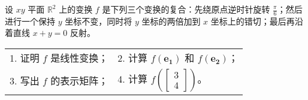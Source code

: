 	\begin{exercise}[1.2.7]
		设 $xy$ 平面 $\mathbb{R}^2$ 上的变换 $f$ 是下列三个变换的复合：先绕原点逆时针旋转 $\frac{\pi}{6}$；然后进行一个保持 $y$ 坐标不变，同时将 $y$ 坐标的两倍加到 $x$ 坐标上的错切；最后再沿着直线 $x+y=0$ 反射。
		\begin{table}[htbp]
			\centering
			\begin{tabular}{p{0.45\textwidth}p{}}
				1. 证明 $f$ 是线性变换；&2. 计算 $f(\boldsymbol{e_1})$ 和 $f(\boldsymbol{e_2})$；\\
				3. 写出 $f$ 的表示矩阵；&4. 计算 $f\left(\begin{bmatrix}
					3\\4
				\end{bmatrix}\right)$。
			\end{tabular}
		\end{table}
	\end{exercise}

